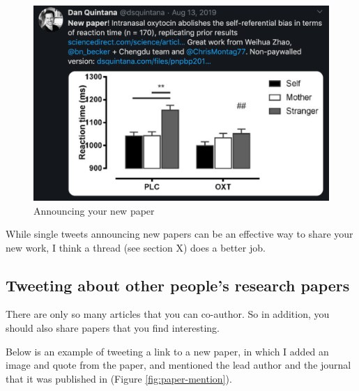 \documentclass[]{book}
\begin{document}
\begin{figure}

{\centering \includegraphics[width=0.8\linewidth]{images/new_paper_own} 

}

\caption{Announcing your new paper}\label{fig:new-paper-own}
\end{figure}

While single tweets announcing new papers can be an effective way to share your new work, I think a thread (see section X) does a better job.

\hypertarget{tweeting-about-other-peoples-research-papers}{%
\subsection{Tweeting about other people's research papers}\label{tweeting-about-other-peoples-research-papers}}

There are only so many articles that you can co-author. So in addition, you should also share papers that you find interesting.

Below is an example of tweeting a link to a new paper, in which I added an image and quote from the paper, and mentioned the lead author and the journal that it was published in (Figure \ref{fig:paper-mention}).
\end{document}
